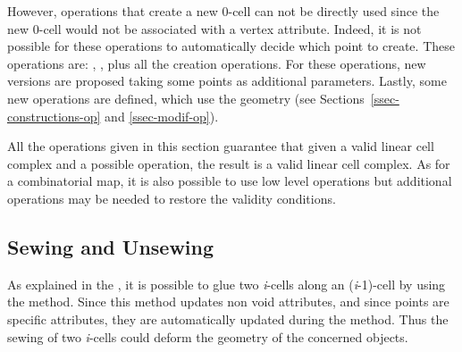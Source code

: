 However, operations that create a new 0-cell can not be directly used
since the new 0-cell would not be associated with a vertex
attribute. Indeed, it is not possible for these operations to
automatically decide which point to create. These operations are:
, 
, plus all the creation
operations. For these operations, new versions are proposed taking
some points as additional parameters.  Lastly, some new operations are
defined, which use the geometry (see Sections~\ref{ssec-constructions-op} and
\ref{ssec-modif-op}).

All the operations given in this section guarantee that given a valid
linear cell complex and a possible operation, the result is a valid
linear cell complex. As for a combinatorial map, it is also possible
to use low level operations but additional operations may be needed to
restore the validity conditions.

\subsection{Sewing and Unsewing \label{ssec-lcc-link-darts}}

As explained in the 
,
it is possible to glue two
\emph{i}-cells along an (\emph{i}-1)-cell by using the 
method. Since this method updates non void attributes, and since
points are specific attributes, they are automatically updated during
the  method. Thus the sewing of two \emph{i}-cells could
deform the geometry of the concerned objects.

